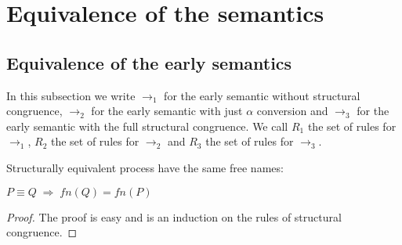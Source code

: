 \section{Equivalence of the semantics}
\subsection{Equivalence of the early semantics}
In this subsection we write $\rightarrow_{1}$ for the early semantic without structural congruence, $\rightarrow_{2}$ for the early semantic with just $\alpha$ conversion and $\rightarrow_{3}$ for the early semantic with the full structural congruence. We call $R_{1}$ the set of rules for $\rightarrow_{1}$, $R_{2}$ the set of rules for $\rightarrow_{2}$ and $R_{3}$ the set of rules for $\rightarrow_{3}$. 


\begin{lemma}
  Structurally equivalent process have the same free names:
  \begin{center}
    $P\equiv Q\; \Rightarrow\; fn(Q)= fn(P)$
  \end{center}
  \begin{proof}
    The proof is easy and is an induction on the rules of structural congruence.
  \end{proof}
\end{lemma}

